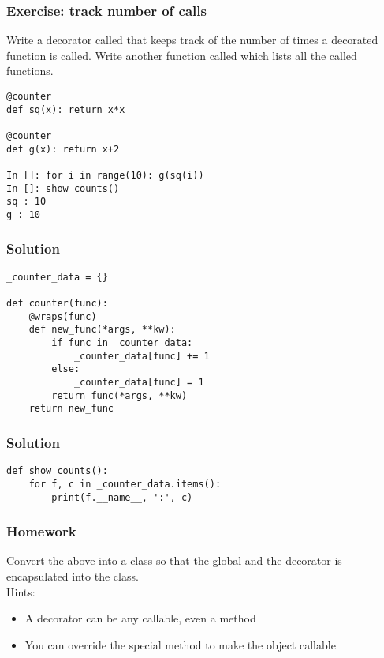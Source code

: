 \documentclass[14pt,compress,aspectratio=169]{beamer}
\begin{document}
\begin{frame}
  \frametitle{Exercise: track number of calls}
  \begin{block}{}
    Write a decorator called  that keeps track of the number of
    times a decorated function is called.  Write another function called
     which lists all the called functions.
  \end{block}

  \small
\begin{lstlisting}
@counter
def sq(x): return x*x

@counter
def g(x): return x+2

In []: for i in range(10): g(sq(i))
In []: show_counts()
sq : 10
g : 10

\end{lstlisting}
\end{frame}


\begin{frame}
  \frametitle{Solution}
\begin{lstlisting}
_counter_data = {}

def counter(func):
    @wraps(func)
    def new_func(*args, **kw):
        if func in _counter_data:
            _counter_data[func] += 1
        else:
            _counter_data[func] = 1
        return func(*args, **kw)
    return new_func
\end{lstlisting}
\end{frame}

\begin{frame}
  \frametitle{Solution}
\begin{lstlisting}
def show_counts():
    for f, c in _counter_data.items():
        print(f.__name__, ':', c)
\end{lstlisting}
\end{frame}

\begin{frame}
  \frametitle{Homework}
  \begin{block}{}
    Convert the above into a class so that the global  and
    the decorator is encapsulated into the class.\\

    Hints:
    \begin{itemize}
    \item A decorator can be any callable, even a method
    \item You can override the  special method to make the object callable
    \end{itemize}

  \end{block}
\end{frame}
\end{document}
